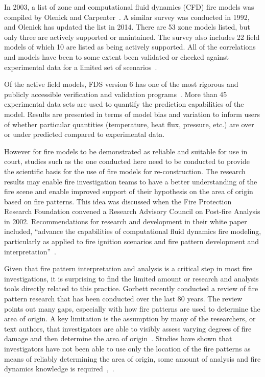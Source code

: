 \documentclass[twoside]{uocthesis}
\begin{document}
In 2003, a list of zone and computational fluid dynamics (CFD) fire models was compiled by Olenick and Carpenter~\cite{Olenick:2003}. A similar survey was conducted in 1992, and Olenick has updated the list in 2014. There are 53 zone models listed, but only three are actively supported or maintained.  The survey also includes 22 field models of which 10 are listed as being actively supported.  All of the correlations and models have been to some extent been validated or checked against experimental data for a limited set of scenarios~\cite{ASTM_E1355}.

Of the active field models, FDS version 6 has one of the most rigorous and publicly accessible verification and validation programs~\cite{McGrattan:2014}. More than 45 experimental data sets are used to quantify the prediction capabilities of the model.  Results are presented in terms of model bias and variation to inform users of whether particular quantities (temperature, heat flux, pressure, etc.) are over or under predicted compared to experimental data.

However for fire models to be demonstrated as reliable and suitable for use in court, studies such as the one conducted here need to be conducted to provide the scientific basis for the use of fire models for re-construction.  The research results may enable fire investigation teams to have a better understanding of the fire scene and enable improved support of their hypothesis on the area of origin based on fire patterns.  This idea was discussed when the Fire Protection Research Foundation convened a Research Advisory Council on Post-fire Analysis in 2002.  Recommendations for research and development in their white paper included, ``advance the capabilities of computational fluid dynamics fire modeling, particularly as applied to fire ignition scenarios and fire pattern development and interpretation''~\cite{RAC:2002}.

Given that fire pattern interpretation and analysis is a critical step in most fire investigations, it is surprising to find the limited amount or research and analysis tools directly related to this practice.  Gorbett recently conducted a review of fire pattern research that has been conducted over the last 80 years. The review points out many gaps, especially with how fire patterns are used to determine the area of origin.  A key limitation is the assumption by many of the researchers, or text authors, that investigators are able to visibly assess varying degrees of fire damage and then determine the area of origin~\cite{Gorbett_2015}. Studies have shown that investigators have not been able to use only the location of the fire patterns as means of reliably determining the area of origin, some amount of analysis and fire dynamics knowledge is required~\cite{Carmen_2008},~\cite{Tinsley_2013}.      
\end{document}
